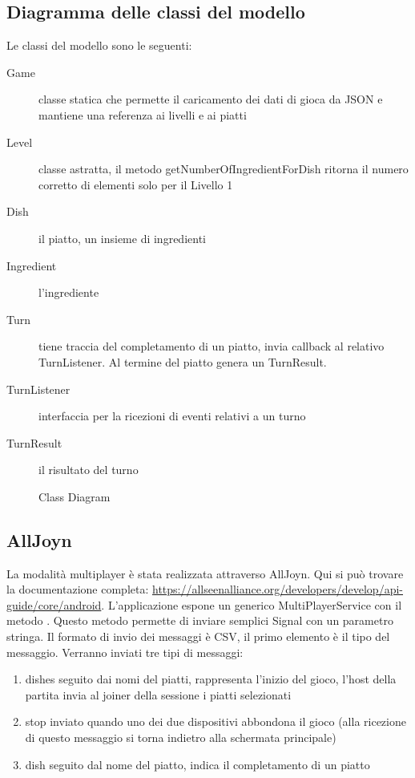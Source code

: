 \subsection{Diagramma delle classi del modello}

Le classi del modello sono le seguenti:
\begin{description}
\item[Game] classe statica che permette il caricamento dei dati di gioca da JSON e mantiene una referenza ai livelli e ai piatti

\item[Level] classe astratta, il metodo getNumberOfIngredientForDish ritorna il numero corretto di elementi solo per il Livello 1

\item[Dish] il piatto, un insieme di ingredienti

\item[Ingredient] l’ingrediente

\item[Turn] tiene traccia del completamento di un piatto, invia callback al relativo TurnListener. Al termine del piatto genera un TurnResult.

\item[TurnListener] interfaccia per la ricezioni di eventi relativi a un turno

\item[TurnResult] il risultato del turno
\end{description}

\begin{figure}[h!]
\caption{Class Diagram}
\label{fig:uml}
\end{figure}

\subsection{AllJoyn}
La modalità multiplayer è stata realizzata attraverso AllJoyn. Qui si può trovare la documentazione completa: \url{https://allseenalliance.org/developers/develop/api-guide/core/android}.
L’applicazione espone un generico MultiPlayerService con il metodo . Questo metodo permette di inviare semplici Signal con un parametro stringa.
Il formato di invio dei messaggi è CSV, il primo elemento è il tipo del messaggio.
Verranno inviati tre tipi di messaggi:
\begin{enumerate}
\item dishes seguito dai nomi del piatti, rappresenta l’inizio del gioco, l’host della partita invia al joiner della sessione i piatti selezionati
\item stop inviato quando uno dei due dispositivi abbondona il gioco (alla ricezione di questo messaggio si torna indietro alla schermata principale)
\item dish seguito dal nome del piatto, indica il completamento di un piatto
\end{enumerate}

